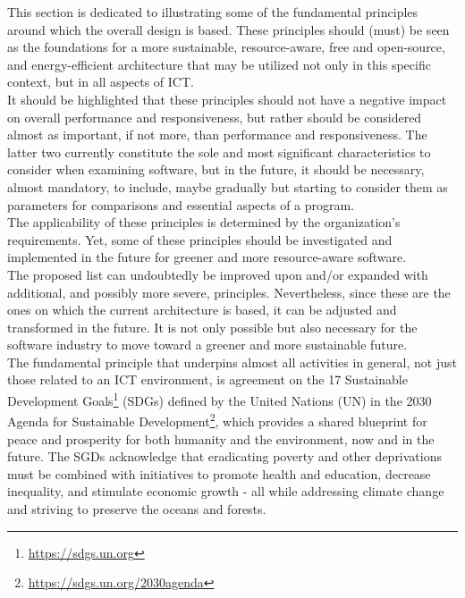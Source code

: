 This section is dedicated to illustrating some of the fundamental principles around
which the overall design is based. These principles should (must) be seen as the
foundations for a more sustainable, resource-aware, free and open-source, and energy-efficient
architecture that may be utilized not only in this specific context, but in all
aspects of ICT. \\ %
It should be highlighted that these principles should not have a negative impact
on overall performance and responsiveness, but rather should be considered almost
as important, if not more, than performance and responsiveness. The latter two
currently constitute the sole and most significant characteristics to consider
when examining software, but in the future, it should be necessary, almost mandatory,
to include, maybe gradually but starting to consider them as parameters for comparisons
and essential aspects of a program. \\ %
The applicability of these principles is determined by the organization's requirements.
Yet, some of these principles should be investigated and implemented in the future
for greener and more resource-aware software. \\ %
The proposed list can undoubtedly be improved upon and/or expanded with additional,
and possibly more severe, principles. Nevertheless, since these are the ones on which
the current architecture is based, it can be adjusted and transformed in the
future. It is not only possible but also necessary for the software industry to move
toward a greener and more sustainable future. \\ %

The fundamental principle that underpins almost all activities in general, not just
those related to an ICT environment, is agreement on the 17 Sustainable
Development Goals\footnote{\url{https://sdgs.un.org}} (SDGs) defined by the
United Nations (UN) in the 2030 Agenda for Sustainable Development\footnote{\url{https://sdgs.un.org/2030agenda}},
which provides a shared blueprint for peace and prosperity for both humanity and
the environment, now and in the future. The SGDs acknowledge that eradicating poverty
and other deprivations must be combined with initiatives to promote health and education,
decrease inequality, and stimulate economic growth - all while addressing climate
change and striving to preserve the oceans and forests.

\clearpage
\newpage


